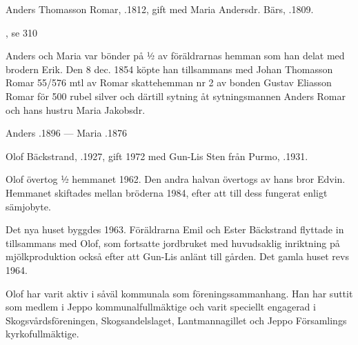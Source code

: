 Anders  Thomasson Romar, .1812, gift med Maria Andersdr. Bärs, .1809.
\begin{jhchildren}
  \item {}, se 310
  \item {}
  \item {}
  \item {}
  \item {}
  \item {}
  \item {}
\end{jhchildren}

Anders och Maria var bönder på ½  av föräldrarnas hemman som han delat med brodern Erik. Den 8 dec. 1854 köpte han tillsammans med Johan Thomasson Romar 55/576 mtl av Romar skattehemman nr 2 av bonden Gustav Eliasson Romar för 500 rubel silver och därtill sytning åt sytningsmannen Anders Romar och hans hustru Maria Jakobsdr.

Anders .1896  ---  Maria  .1876






Olof Bäckstrand, .1927, gift 1972 med Gun-Lis Sten från Purmo, .1931.

Olof övertog  ½ hemmanet 1962. Den andra  halvan övertogs av hans bror Edvin. Hemmanet skiftades mellan bröderna 1984, efter att till dess fungerat enligt sämjobyte.

Det nya huset byggdes 1963. Föräldrarna Emil och Ester Bäckstrand flyttade in tillsammans med Olof, som fortsatte jordbruket med huvudsaklig inriktning på mjölkproduktion också efter att Gun-Lis anlänt till gården. Det gamla huset revs 1964.

Olof har varit aktiv i såväl kommunala som föreningssammanhang. Han har suttit som medlem i Jeppo kommunalfullmäktige och varit speciellt engagerad i Skogsvårdsföreningen, Skogsandelslaget, Lantmannagillet och Jeppo Församlings kyrkofullmäktige.


